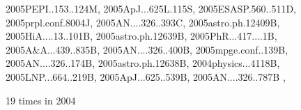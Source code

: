 \documentclass[12pt]{article}
\begin{document}
\begin{description}
{2005PEPI..153..124M,%
2005ApJ...625L.115S,%
2005ESASP.560..511D,%
2005prpl.conf.8004J,%
2005AN....326..393C,%
2005astro.ph.12409B,%
2005HiA....13..101B,%
2005astro.ph.12639B,%
2005PhR...417....1B,%
2005A&A...439..835B,%
2005AN....326..400B,%
2005mpge.conf..139B,%
2005AN....326..174B,%
2005astro.ph.12638B,%
2004physics...4118B,%
2005LNP...664..219B,%
2005ApJ...625..539B,%
2005AN....326..787B%
},\item
19 times in 2004 \citep{
2004ASPC..325..165N,%
2004A&A...427...13B,%
2004IJAsB...3..209B,%
2004IAUS..219..656D,%
2004A&A...423.1101D,%
2004PhRvE..70b6405H,%
2004PhRvE..70c6408H,%
}
\end{description}
\end{document}
